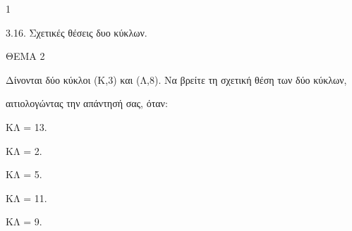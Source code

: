 \begin{ylh}{1}
    \item 3.16. Σχετικές θέσεις δυο κύκλων.
\end{ylh}

ΘΕΜΑ 2

Δίνονται δύο κύκλοι (Κ,3) και (Λ,8). Να βρείτε τη σχετική θέση των δύο κύκλων,

αιτιολογώντας την απάντησή σας, όταν:

\begin{alist}
\item ΚΛ = 13. 

\item ΚΛ = 2. 

\item ΚΛ = 5. 

\item ΚΛ = 11. 

\item ΚΛ = 9. 
\end{alist}
